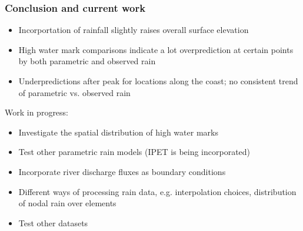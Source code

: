 \documentclass[10pt]{oden_beamer}
\begin{document}
\begin{frame}
  \frametitle{Conclusion and current work}
  \begin{itemize}
  \item Incorportation of rainfall slightly raises overall surface elevation
  \item High water mark comparisons indicate a lot overprediction at certain points by both parametric and observed rain
  \item Underpredictions after peak for locations along the coast; no consistent trend of parametric vs. observed rain
  \end{itemize}
  Work in progress:
  \begin{itemize}
  \item Investigate the spatial distribution of high water marks
  \item Test other parametric rain models (IPET is being incorporated)
  \item Incorporate river discharge fluxes as boundary conditions
  \item Different ways of processing rain data, e.g. interpolation choices, distribution of nodal rain over elements
  \item Test other datasets
  \end{itemize}
\end{frame}
\end{document}

